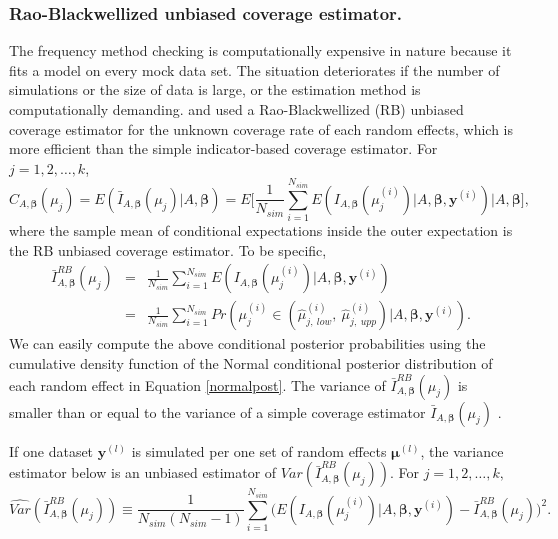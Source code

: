 \documentclass[article]{jss}
\begin{document}
\subsubsection{Rao-Blackwellized unbiased coverage estimator.}
The frequency method checking is computationally expensive in nature because it  fits a model on every mock data set. The situation deteriorates if the number of simulations or the size of data is large, or the estimation method is computationally demanding. \citet{morris1997} and \cite{tang2002fitting} used a Rao-Blackwellized (RB) unbiased coverage estimator for the unknown coverage rate of each random effects, which is more efficient than the simple indicator-based coverage estimator.  For $j=1, 2, \ldots, k$,
\begin{equation}\label{RB_theory}
C_{A, \boldsymbol{\beta}}(\mu_j)=E(\bar{I}_{A, \boldsymbol{\beta}}(\mu_j)\vert A, \boldsymbol{\beta})=E\bigg[\frac{1}{N_{sim}}\sum_{i=1}^{N_{sim}}E(I_{A, \boldsymbol{\beta}}(\mu_j^{(i)})\vert A, \boldsymbol{\beta}, \boldsymbol{y}^{(i)})\bigg\vert A, \boldsymbol{\beta}\bigg],
\end{equation}
where the sample mean of conditional expectations inside the outer expectation is the RB unbiased coverage estimator. To be specific,
\begin{eqnarray}\label{RB}
\bar{I}^{RB}_{A, \boldsymbol{\beta}}(\mu_j) &=& \frac{1}{N_{sim}}\sum_{i=1}^{N_{sim}}E(I_{A, \boldsymbol{\beta}}(\mu_j^{(i)})\vert A, \boldsymbol{\beta}, \boldsymbol{y}^{(i)})\\
&=& \frac{1}{N_{sim}}\sum_{i=1}^{N_{sim}} Pr(\mu_j^{(i)}\in(\hat{\mu}^{(i)}_{j, ~low}, ~\hat{\mu}^{(i)}_{j, ~upp})\vert A, \boldsymbol{\beta},  \boldsymbol{y}^{(i)}).\nonumber
\end{eqnarray}
We  can easily compute the above conditional posterior probabilities using the cumulative density function of the Normal conditional posterior distribution of each random effect in Equation \ref{normalpost}. The variance of  $\bar{I}^{RB}_{A, \boldsymbol{\beta}}(\mu_j)$ is smaller than or equal to the variance of a simple coverage estimator $\bar{I}_{A, \boldsymbol{\beta}}(\mu_j)$ \citep{radhakrishna1945information, blackwell1947conditional}.






If one dataset $\boldsymbol{y}^{(l)}$ is simulated per one set of random effects $\boldsymbol{\mu}^{(l)}$, the variance estimator below is an unbiased estimator of $Var(\bar{I}^{RB}_{A, \boldsymbol{\beta}}(\mu_j) )$. For $j=1, 2, \ldots, k,$
\begin{equation}\label{RBvar}
\widehat{Var}(\bar{I}^{RB}_{A, \boldsymbol{\beta}}(\mu_j) )\equiv\frac{1}{N_{sim}(N_{sim}-1)}\sum_{i=1}^{N_{sim}}\bigg(E(I_{A, \boldsymbol{\beta}}(\mu_j^{(i)})\vert A, \boldsymbol{\beta}, \boldsymbol{y}^{(i)})-\bar{I}^{RB}_{A, \boldsymbol{\beta}}(\mu_j) \bigg)^{2}.
\end{equation}
\end{document}

